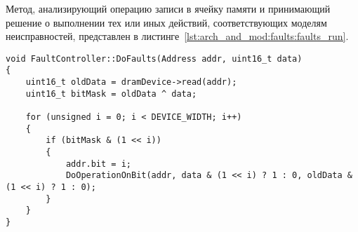 Метод, анализирующий операцию записи в ячейку памяти и принимающий решение о выполнении тех или иных действий, соответствующих моделям неисправностей, представлен в листинге~\ref{lst:arch_and_mod:faults:faults_run}.

\begin{lstlisting}[style=cplusplusstyle, caption={Реализаия поведения ячеек с функциональными неисправностями}, label=lst:arch_and_mod:faults:faults_run]
void FaultController::DoFaults(Address addr, uint16_t data)
{
    uint16_t oldData = dramDevice->read(addr);
    uint16_t bitMask = oldData ^ data;
  
    for (unsigned i = 0; i < DEVICE_WIDTH; i++)
    {
        if (bitMask & (1 << i))
        {
            addr.bit = i;
            DoOperationOnBit(addr, data & (1 << i) ? 1 : 0, oldData & (1 << i) ? 1 : 0);
        }
    }
}


\end{lstlisting}
